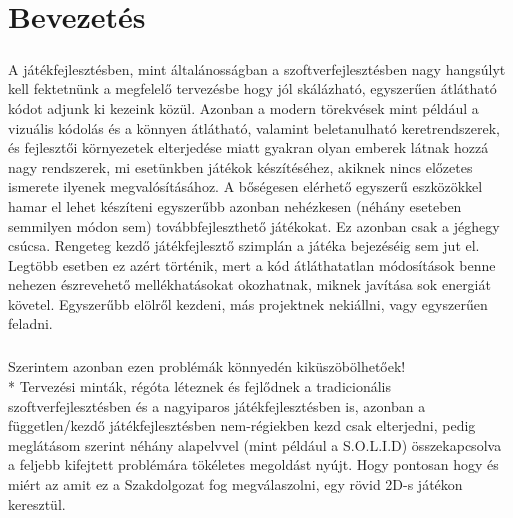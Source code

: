 \chapter{Bevezetés} %
\label{ch:intro}

\paragraph{}
A játékfejlesztésben, mint általánosságban a szoftverfejlesztésben nagy hangsúlyt kell fektetnünk a megfelelő tervezésbe hogy jól skálázható, egyszerűen átlátható kódot adjunk ki kezeink közül. Azonban a modern törekvések mint például a vizuális kódolás és a könnyen átlátható, valamint beletanulható keretrendszerek, és fejlesztői környezetek elterjedése miatt gyakran olyan emberek látnak hozzá nagy rendszerek, mi esetünkben játékok készítéséhez, akiknek nincs előzetes ismerete ilyenek megvalósításához. A bőségesen elérhető egyszerű eszközökkel hamar el lehet készíteni egyszerűbb azonban nehézkesen (néhány eseteben semmilyen módon sem) továbbfejleszthető játékokat. Ez azonban csak a jéghegy csúcsa. Rengeteg kezdő játékfejlesztő szimplán a játéka bejezéséig sem jut el. Legtöbb esetben ez azért történik, mert a kód átláthatatlan módosítások benne nehezen észrevehető mellékhatásokat okozhatnak, miknek javítása sok energiát követel. Egyszerűbb elölről kezdeni, más projektnek nekiállni, vagy egyszerűen feladni.
\paragraph{}
Szerintem azonban ezen problémák könnyedén kiküszöbölhetőek!\\*
Tervezési minták, régóta léteznek és fejlődnek a tradicionális szoftverfejlesztésben és a nagyiparos játékfejlesztésben is, azonban a független/kezdő játékfejlesztésben nem-régiekben kezd csak elterjedni, pedig meglátásom szerint néhány alapelvvel (mint például a S.O.L.I.D) összekapcsolva a feljebb kifejtett problémára tökéletes megoldást nyújt. Hogy pontosan hogy és miért az amit ez a Szakdolgozat fog megválaszolni, egy rövid 2D-s játékon keresztül.

